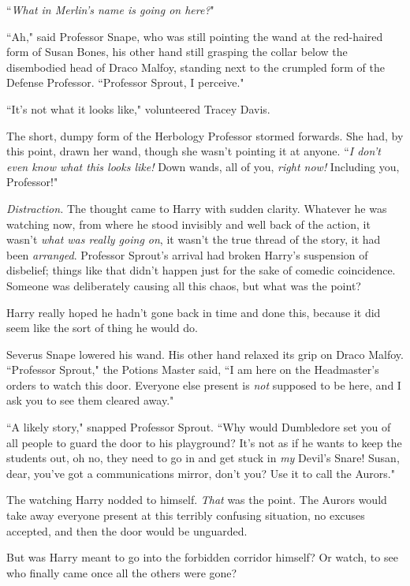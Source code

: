 ``\emph{What in Merlin's name is going on here?}"

``Ah," said Professor Snape, who was still pointing the wand at the red-haired form of Susan Bones, his other hand still grasping the collar below the disembodied head of Draco Malfoy, standing next to the crumpled form of the Defense Professor. ``Professor Sprout, I perceive."

``It's not what it looks like," volunteered Tracey Davis.

The short, dumpy form of the Herbology Professor stormed forwards. She had, by this point, drawn her wand, though she wasn't pointing it at anyone. ``\emph{I don't even know what this looks like!} Down wands, all of you, \emph{right now!} Including you, Professor!"

\emph{Distraction.} The thought came to Harry with sudden clarity. Whatever he was watching now, from where he stood invisibly and well back of the action, it wasn't \emph{what was really going on}, it wasn't the true thread of the story, it had been \emph{arranged}. Professor Sprout's arrival had broken Harry's suspension of disbelief; things like that didn't happen just for the sake of comedic coincidence. Someone was deliberately causing all this chaos, but what was the point?

Harry really hoped he hadn't gone back in time and done this, because it did seem like the sort of thing he would do.

Severus Snape lowered his wand. His other hand relaxed its grip on Draco Malfoy. ``Professor Sprout," the Potions Master said, ``I am here on the Headmaster's orders to watch this door. Everyone else present is \emph{not} supposed to be here, and I ask you to see them cleared away."

``A likely story," snapped Professor Sprout. ``Why would Dumbledore set you of all people to guard the door to his playground? It's not as if he wants to keep the students out, oh no, they need to go in and get stuck in \emph{my} Devil's Snare! Susan, dear, you've got a communications mirror, don't you? Use it to call the Aurors."

The watching Harry nodded to himself. \emph{That} was the point. The Aurors would take away everyone present at this terribly confusing situation, no excuses accepted, and then the door would be unguarded.

But was Harry meant to go into the forbidden corridor himself? Or watch, to see who finally came once all the others were gone?

